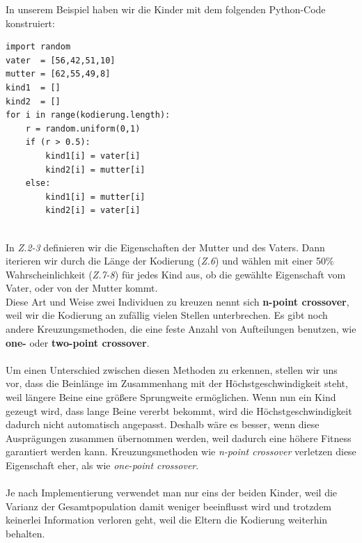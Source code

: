 \newpage
            \noindent
            In unserem Beispiel haben wir die Kinder mit dem folgenden Python-Code konstruiert:
            \hfill \\
            \begin{mdframed}
            \begin{verbatim}
import random
vater  = [56,42,51,10]
mutter = [62,55,49,8]
kind1  = []
kind2  = []
for i in range(kodierung.length):
    r = random.uniform(0,1)
    if (r > 0.5):
        kind1[i] = vater[i]
        kind2[i] = mutter[i]
    else:
        kind1[i] = mutter[i]
        kind2[i] = vater[i]
            \end{verbatim}
            \end{mdframed}
            \hfill \\[4mm]
            \noindent
            In \textit{Z.2-3} definieren wir die Eigenschaften der Mutter und des Vaters. Dann iterieren wir durch die Länge der Kodierung (\textit{Z.6}) und wählen mit einer 50\% Wahrscheinlichkeit (\textit{Z.7-8}) für jedes Kind aus, ob die gewählte Eigenschaft vom Vater, oder von der Mutter kommt.\\

            \noindent
            Diese Art und Weise zwei Individuen zu kreuzen nennt sich \textbf{n-point crossover}, weil wir die Kodierung an zufällig vielen Stellen unterbrechen. Es gibt noch andere Kreuzungsmethoden, die eine feste Anzahl von Aufteilungen benutzen, wie \textbf{one-} oder \textbf{two-point crossover}. \\
            \\
            \noindent
            Um einen Unterschied zwischen diesen Methoden zu erkennen, stellen wir uns vor, dass die Beinlänge im Zusammenhang mit der Höchstgeschwindigkeit steht, weil längere Beine eine größere Sprungweite ermöglichen. Wenn nun ein Kind gezeugt wird, dass lange Beine vererbt bekommt, wird die Höchstgeschwindigkeit dadurch nicht automatisch angepasst. Deshalb wäre es besser, wenn diese Ausprägungen zusammen übernommen werden, weil dadurch eine höhere Fitness garantiert werden kann. Kreuzungsmethoden wie \textit{n-point crossover} verletzen diese Eigenschaft eher, als wie \textit{one-point crossover}.\\
            \\
            \noindent
            Je nach Implementierung verwendet man nur eins der beiden Kinder, weil die Varianz der Gesamtpopulation damit weniger beeinflusst wird und trotzdem keinerlei Information verloren geht, weil die Eltern die Kodierung weiterhin behalten.

